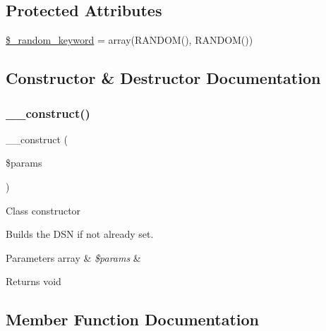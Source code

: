 \subsection*{Protected Attributes}
\begin{DoxyCompactItemize}
\item 
\mbox{\hyperlink{class_c_i___d_b__pdo__sqlite__driver_a10213aa6e05f6d924d3277bb1d2fea00}{\$\+\_\+random\+\_\+keyword}} = array(\textquotesingle{}R\+A\+N\+D\+OM()\textquotesingle{}, \textquotesingle{}R\+A\+N\+D\+OM()\textquotesingle{})
\end{DoxyCompactItemize}


\subsection{Constructor \& Destructor Documentation}
\mbox{\label{class_c_i___d_b__pdo__sqlite__driver_a9162320adff1a1a4afd7f2372f753a3e}} 
\subsubsection{\texorpdfstring{\+\_\+\+\_\+construct()}{\_\_construct()}}
{\footnotesize\ttfamily \+\_\+\+\_\+construct (\begin{DoxyParamCaption}\item[{}]{\$params }\end{DoxyParamCaption})}

Class constructor

Builds the D\+SN if not already set.


\begin{DoxyParams}[1]{Parameters}
array & {\em \$params} & \\
\hline
\end{DoxyParams}
\begin{DoxyReturn}{Returns}
void 
\end{DoxyReturn}


\subsection{Member Function Documentation}
\mbox{\label{class_c_i___d_b__pdo__sqlite__driver_a435c0f3ce54fe7daa178baa8532ebd54}} 
